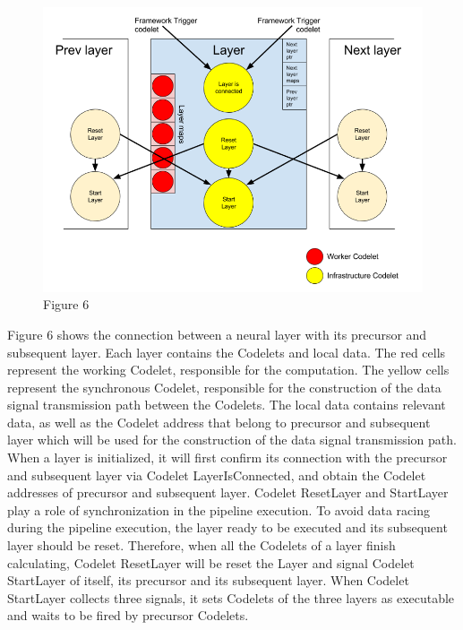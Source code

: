 \begin{figure}[h]
\caption{Figure 6}
\centering
\includegraphics[width=1\textwidth]{Fig/figure6.png}
\end{figure}
Figure 6 shows the connection between a neural layer with its precursor and subsequent layer. Each layer contains the Codelets and local data. The red cells represent the working Codelet, responsible for the computation. The yellow cells represent the synchronous Codelet, responsible for the construction of the data signal transmission path between the Codelets. The local data contains relevant data, as well as the Codelet address that belong to precursor and subsequent layer which will be used for the construction of the data signal transmission path. When a layer is initialized, it will first confirm its connection with the precursor and subsequent layer via Codelet LayerIsConnected, and obtain the Codelet addresses of precursor and subsequent layer. Codelet ResetLayer and StartLayer play a role of synchronization in the pipeline execution. To avoid data racing during the pipeline execution, the layer ready to be executed and its subsequent layer should be reset. Therefore, when all the Codelets of a layer finish calculating, Codelet ResetLayer will be reset the Layer and signal Codelet StartLayer of itself, its precursor and its subsequent layer. When Codelet StartLayer collects three signals, it sets Codelets of the three layers as executable and waits to be fired by precursor Codelets.

